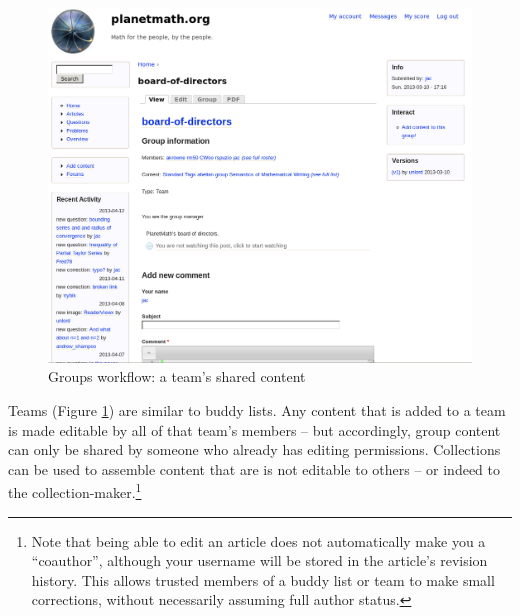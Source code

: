 \begin{vplace}[0.7]
\begin{figure}[h]
\begin{center}
\includegraphics[width=.85\textwidth]{./inputs/TeamWorkflow.png}
\end{center}
\caption{Groups workflow: a team's shared content \label{TeamWorkflow}}
\end{figure}
\bigskip

Teams (Figure \ref{TeamWorkflow}) are similar to buddy lists.  Any
content that is added to a team is made editable by all of that team's
members -- but accordingly, group content can only be shared by
someone who already has editing permissions.  Collections can be used
to assemble content that are is not editable to others -- or indeed to
the collection-maker.\footnote{Note that being able to edit an article
  does not automatically make you a ``coauthor'', although your
  username will be stored in the article's revision history.  This
  allows trusted members of a buddy list or team to make small
  corrections, without necessarily assuming full author status.}
\end{vplace}

\FloatBarrier
